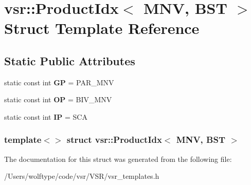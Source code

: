 \hypertarget{structvsr_1_1_product_idx_3_01_m_n_v_00_01_b_s_t_01_4}{\section{vsr\-:\-:Product\-Idx$<$ M\-N\-V, B\-S\-T $>$ Struct Template Reference}
\label{structvsr_1_1_product_idx_3_01_m_n_v_00_01_b_s_t_01_4}
}
\subsection*{Static Public Attributes}
\begin{DoxyCompactItemize}
\item 
\hypertarget{structvsr_1_1_product_idx_3_01_m_n_v_00_01_b_s_t_01_4_ab33ba4577d129063a222e5e035cc1538}{static const int {\bfseries G\-P} = P\-A\-R\-\_\-\-M\-N\-V}\label{structvsr_1_1_product_idx_3_01_m_n_v_00_01_b_s_t_01_4_ab33ba4577d129063a222e5e035cc1538}

\item 
\hypertarget{structvsr_1_1_product_idx_3_01_m_n_v_00_01_b_s_t_01_4_aff86c45f8e8983be901ee9bac1f1bcf6}{static const int {\bfseries O\-P} = B\-I\-V\-\_\-\-M\-N\-V}\label{structvsr_1_1_product_idx_3_01_m_n_v_00_01_b_s_t_01_4_aff86c45f8e8983be901ee9bac1f1bcf6}

\item 
\hypertarget{structvsr_1_1_product_idx_3_01_m_n_v_00_01_b_s_t_01_4_ac2ec7ab861b583a09cb90e030c0a68d8}{static const int {\bfseries I\-P} = S\-C\-A}\label{structvsr_1_1_product_idx_3_01_m_n_v_00_01_b_s_t_01_4_ac2ec7ab861b583a09cb90e030c0a68d8}

\end{DoxyCompactItemize}
\subsubsection*{template$<$$>$ struct vsr\-::\-Product\-Idx$<$ M\-N\-V, B\-S\-T $>$}



The documentation for this struct was generated from the following file\-:\begin{DoxyCompactItemize}
\item 
/\-Users/wolftype/code/vsr/\-V\-S\-R/vsr\-\_\-templates.\-h\end{DoxyCompactItemize}
